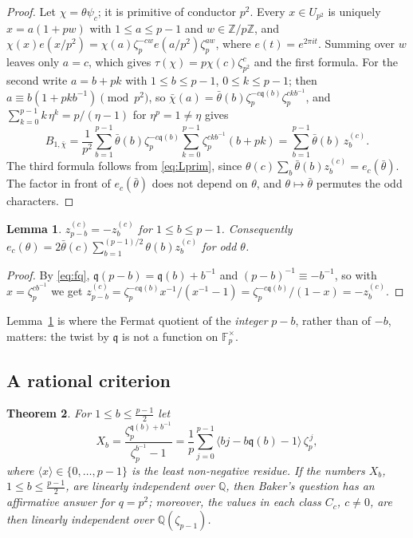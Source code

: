 \documentclass[11pt]{amsart}
\newtheorem{theorem}{Theorem}[section]
\newtheorem{lemma}[theorem]{Lemma}
\theoremstyle{definition}
\theoremstyle{remark}
\providecommand{\Q}{\mathbb Q}
\providecommand{\Z}{\mathbb Z}
\providecommand{\F}{\mathbb F}
\newcommand{\fq}{\mathfrak q}
\numberwithin{equation}{section}
\begin{document}
\begin{proof}
Let $\chi=\theta\psi_c$; it is primitive of conductor $p^2$.
Every $x\in U_{p^2}$ is uniquely $x=a(1+pw)$ with $1\le a\le p-1$ and $w\in\Z/p\Z$, and $\chi(x)e(x/p^2)=\chi(a)\zeta_p^{-cw}e(a/p^2)\zeta_p^{aw}$, where $e(t)=e^{2\pi it}$.
Summing over $w$ leaves only $a=c$, which gives $\tau(\chi)=p\chi(c)\zeta_{p^2}^c$ and the first formula.
For the second write $a=b+pk$ with $1\le b\le p-1$, $0\le k\le p-1$; then $a\equiv b(1+pkb^{-1})\pmod{p^2}$, so $\bar\chi(a)=\bar\theta(b)\zeta_p^{-c\fq(b)}\zeta_p^{ckb^{-1}}$, and $\sum_{k=0}^{p-1}k\,\eta^k=p/(\eta-1)$ for $\eta^p=1\ne\eta$ gives
\[
B_{1,\bar\chi}=\frac1{p^2}\sum_{b=1}^{p-1}\bar\theta(b)\zeta_p^{-c\fq(b)}\sum_{k=0}^{p-1}\zeta_p^{ckb^{-1}}(b+pk)=\sum_{b=1}^{p-1}\bar\theta(b)\,z_b^{(c)} .
\]
The third formula follows from \eqref{eq:Lprim}, since $\theta(c)\sum_b\bar\theta(b)z_b^{(c)}=e_c(\bar\theta)$.
The factor in front of $e_c(\bar\theta)$ does not depend on $\theta$, and $\theta\mapsto\bar\theta$ permutes the odd characters.
\end{proof}

\begin{lemma}\label{lem:symm}
$z^{(c)}_{p-b}=-z^{(c)}_b$ for $1\le b\le p-1$.
Consequently $e_c(\theta)=2\bar\theta(c)\sum_{b=1}^{(p-1)/2}\theta(b)z_b^{(c)}$ for odd $\theta$.
\end{lemma}

\begin{proof}
By \eqref{eq:fq}, $\fq(p-b)=\fq(b)+b^{-1}$ and $(p-b)^{-1}\equiv-b^{-1}$, so with $x=\zeta_p^{cb^{-1}}$ we get $z_{p-b}^{(c)}=\zeta_p^{-c\fq(b)}x^{-1}/(x^{-1}-1)=\zeta_p^{-c\fq(b)}/(1-x)=-z_b^{(c)}$.
\end{proof}

Lemma~\ref{lem:symm} is where the Fermat quotient of the \emph{integer} $p-b$, rather than of $-b$, matters: the twist by $\fq$ is not a function on $\F_p^\times$.

\subsection{A rational criterion}

\begin{theorem}\label{thm:star}
For $1\le b\le\frac{p-1}2$ let
\[
X_b=\frac{\zeta_p^{\fq(b)+b^{-1}}}{\zeta_p^{b^{-1}}-1}=\frac1p\sum_{j=0}^{p-1}\bigl\langle bj-b\fq(b)-1\bigr\rangle\,\zeta_p^{\,j},
\]
where $\langle x\rangle\in\{0,\dots,p-1\}$ is the least non-negative residue.
If the numbers $X_b$, $1\le b\le\frac{p-1}2$, are linearly independent over $\Q$, then Baker's question has an affirmative answer for $q=p^2$; moreover, the values in each class $C_c$, $c\ne0$, are then linearly independent over $\Q(\zeta_{p-1})$.
\end{theorem}
\end{document}
